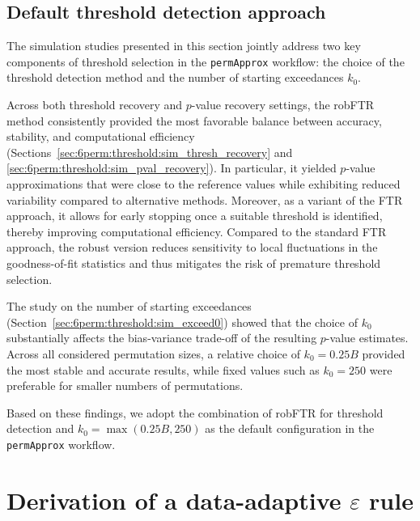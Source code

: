 \subsection{Default threshold detection approach}
\label{sec:6perm:threshold:decision}

The simulation studies presented in this section jointly address two key components of threshold selection in the \texttt{permApprox} workflow: the choice of the threshold detection method and the number of starting exceedances $k_0$. 

Across both threshold recovery and $p$-value recovery settings, the robFTR method consistently provided the most favorable balance between accuracy, stability, and computational efficiency (Sections~\ref{sec:6perm:threshold:sim_thresh_recovery} and \ref{sec:6perm:threshold:sim_pval_recovery}). In particular, it yielded $p$-value approximations that were close to the reference values while exhibiting reduced variability compared to alternative methods. Moreover, as a variant of the FTR approach, it allows for early stopping once a suitable threshold is identified, thereby improving computational efficiency. Compared to the standard FTR approach, the robust version reduces sensitivity to local fluctuations in the goodness-of-fit statistics and thus mitigates the risk of premature threshold selection.

The study on the number of starting exceedances (Section~\ref{sec:6perm:threshold:sim_exceed0}) showed that the choice of $k_0$ substantially affects the bias-variance trade-off of the resulting $p$-value estimates. Across all considered permutation sizes, a relative choice of $k_0 = 0.25B$ provided the most stable and accurate results, while fixed values such as $k_0 = 250$ were preferable for smaller numbers of permutations.

Based on these findings, we adopt the combination of robFTR for threshold detection and $k_0 = \max(0.25B, 250)$ as the default configuration in the \texttt{permApprox} workflow.

\section{Derivation of a data-adaptive \texorpdfstring{$\varepsilon$}{epsilon} rule}
\label{sec:6perm:epsilon}

